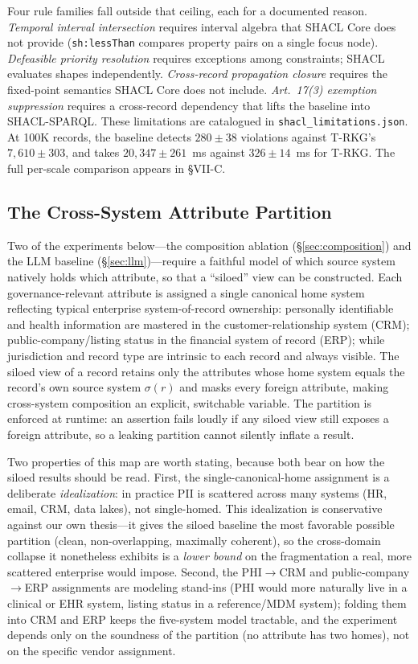 \documentclass{ieeeaccess}
\begin{document}
Four rule families fall outside that ceiling, each for a documented reason. \emph{Temporal interval intersection} requires interval algebra that SHACL Core does not provide (\texttt{sh:lessThan} compares property pairs on a single focus node). \emph{Defeasible priority resolution} requires exceptions among constraints; SHACL evaluates shapes independently. \emph{Cross-record propagation closure} requires the fixed-point semantics SHACL Core does not include. \emph{Art.~17(3) exemption suppression} requires a cross-record dependency that lifts the baseline into SHACL-SPARQL. These limitations are catalogued in \texttt{shacl\_limitations.json}. At 100K records, the baseline detects $280 \pm 38$ violations against T-RKG's $7{,}610 \pm 303$, and takes $20{,}347 \pm 261$~ms against $326 \pm 14$~ms for T-RKG. The full per-scale comparison appears in §VII-C.

\subsection{The Cross-System Attribute Partition}
\label{sec:partition}

Two of the experiments below---the composition ablation (§\ref{sec:composition}) and the LLM baseline (§\ref{sec:llm})---require a faithful model of which source system natively holds which attribute, so that a ``siloed'' view can be constructed. Each governance-relevant attribute is assigned a single canonical home system reflecting typical enterprise system-of-record ownership: personally identifiable and health information are mastered in the customer-relationship system (CRM); public-company/listing status in the financial system of record (ERP); while jurisdiction and record type are intrinsic to each record and always visible. The siloed view of a record retains only the attributes whose home system equals the record's own source system $\sigma(r)$ and masks every foreign attribute, making cross-system composition an explicit, switchable variable. The partition is enforced at runtime: an assertion fails loudly if any siloed view still exposes a foreign attribute, so a leaking partition cannot silently inflate a result.

Two properties of this map are worth stating, because both bear on how the siloed results should be read. First, the single-canonical-home assignment is a deliberate \emph{idealization}: in practice PII is scattered across many systems (HR, email, CRM, data lakes), not single-homed. This idealization is conservative against our own thesis---it gives the siloed baseline the most favorable possible partition (clean, non-overlapping, maximally coherent), so the cross-domain collapse it nonetheless exhibits is a \emph{lower bound} on the fragmentation a real, more scattered enterprise would impose. Second, the PHI$\rightarrow$CRM and public-company$\rightarrow$ERP assignments are modeling stand-ins (PHI would more naturally live in a clinical or EHR system, listing status in a reference/MDM system); folding them into CRM and ERP keeps the five-system model tractable, and the experiment depends only on the soundness of the partition (no attribute has two homes), not on the specific vendor assignment.
\end{document}
